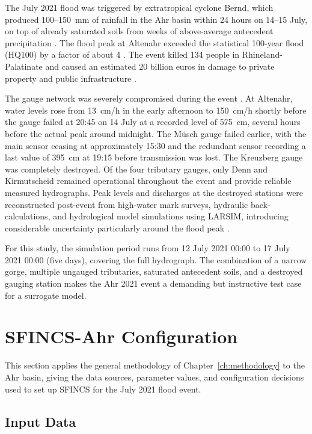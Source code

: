 \documentclass[12pt,a4paper]{report}
\begin{document}
The July 2021 flood was triggered by extratropical cyclone Bernd, which produced
100--150~mm of rainfall in the Ahr basin within 24 hours on 14--15 July, on top of
already saturated soils from weeks of above-average antecedent precipitation
\citep{kreienkamp2021rapid,mohr2023multidisciplinary}. The flood peak at Altenahr exceeded the statistical 100-year flood (HQ100) by a factor of about 4
\citep{mohr2023multidisciplinary}. The event killed 134 people in Rhineland-Palatinate and caused an
estimated 20 billion euros in damage to private property and public infrastructure \citep{lfurlp2022bericht}.

The gauge network was severely compromised during the event \citep{lfurlp2022bericht}. At
Altenahr, water levels rose from 13~cm/h in the early afternoon to 150~cm/h shortly
before the gauge failed at 20:45 on 14 July at a recorded level of 575~cm, several hours
before the actual peak around midnight. The M\"usch gauge failed earlier, with the main
sensor ceasing at approximately 15:30 and the redundant sensor recording a last value of
395~cm at 19:15 before transmission was lost. The Kreuzberg gauge was completely
destroyed. Of the four tributary gauges, only Denn and Kirmutscheid remained operational
throughout the event and provide reliable measured hydrographs. Peak levels and
discharges at the destroyed stations were reconstructed post-event from high-water mark
surveys, hydraulic back-calculations, and hydrological model simulations using LARSIM,
introducing considerable uncertainty particularly around the flood peak \citep{lfurlp2022bericht}.

For this study, the simulation period runs from 12 July 2021 00:00 to 17 July 2021
00:00 (five days), covering the full hydrograph. The combination of a narrow gorge,
multiple ungauged tributaries, saturated antecedent soils, and a destroyed gauging
station makes the Ahr 2021 event a demanding but instructive test case for a surrogate
model.

\section{SFINCS-Ahr Configuration}
\label{sec:sfincs_ahr_config}

This section applies the general methodology of Chapter~\ref{ch:methodology} to the
Ahr basin, giving the data sources, parameter values, and configuration decisions
used to set up SFINCS for the July 2021 flood event.

\subsection{Input Data}
\label{subsec:input_data_ahr}
\end{document}
